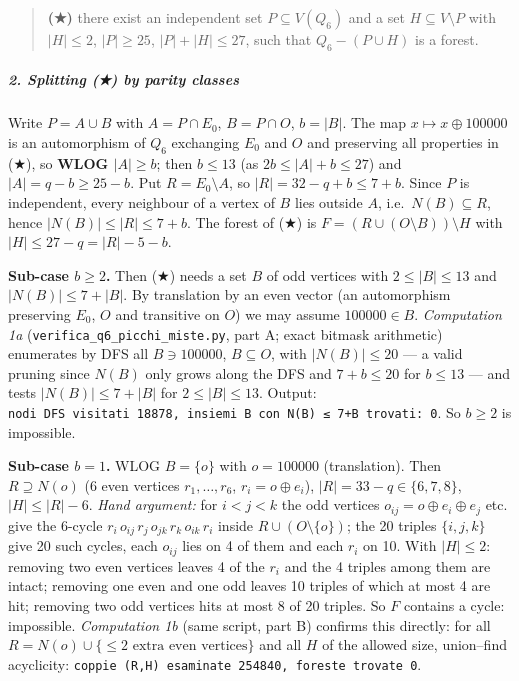 \documentclass[11pt,a4paper]{article}
\begin{document}
\begin{quote}
\textbf{(★)} there exist an independent set \(P\subseteq V(Q_6)\) and a
set \(H\subseteq V\setminus P\) with \(|H|\le2\), \(|P|\ge25\),
\(|P|+|H|\le27\), such that \(Q_6-(P\cup H)\) is a forest.
\end{quote}

\subparagraph{2. Splitting (★) by parity
classes}\label{splitting-by-parity-classes}

Write \(P=A\cup B\) with \(A=P\cap E_0\), \(B=P\cap O\), \(b=|B|\). The
map \(x\mapsto x\oplus 100000\) is an automorphism of \(Q_6\) exchanging
\(E_0\) and \(O\) and preserving all properties in (★), so \textbf{WLOG
\(|A|\ge b\)}; then \(b\le13\) (as \(2b\le|A|+b\le27\)) and
\(|A|=q-b\ge25-b\). Put \(R=E_0\setminus A\), so \(|R|=32-q+b\le7+b\).
Since \(P\) is independent, every neighbour of a vertex of \(B\) lies
outside \(A\), i.e.~\(N(B)\subseteq R\), hence \(|N(B)|\le|R|\le7+b\).
The forest of (★) is \(F=(R\cup(O\setminus B))\setminus H\) with
\(|H|\le27-q=|R|-5-b\).

\textbf{Sub-case \(b\ge2\).} Then (★) needs a set \(B\) of odd vertices
with \(2\le|B|\le13\) and \(|N(B)|\le7+|B|\). By translation by an even
vector (an automorphism preserving \(E_0\), \(O\) and transitive on
\(O\)) we may assume \(100000\in B\). \emph{Computation 1a}
(\texttt{verifica\_q6\_picchi\_miste.py}, part A; exact bitmask
arithmetic) enumerates by DFS all \(B\ni100000\), \(B\subseteq O\), with
\(|N(B)|\le20\) --- a valid pruning since \(N(B)\) only grows along the
DFS and \(7+b\le20\) for \(b\le13\) --- and tests \(|N(B)|\le7+|B|\) for
\(2\le|B|\le13\). Output:
\texttt{nodi\ DFS\ visitati\ 18878,\ insiemi\ B\ con\ \textbar{}N(B)\textbar{}\ ≤\ 7+\textbar{}B\textbar{}\ trovati:\ 0}.
So \(b\ge2\) is impossible.

\textbf{Sub-case \(b=1\).} WLOG \(B=\{o\}\) with \(o=100000\)
(translation). Then \(R\supseteq N(o)\) (6 even vertices
\(r_1,\dots,r_6\), \(r_i=o\oplus e_i\)), \(|R|=33-q\in\{6,7,8\}\),
\(|H|\le|R|-6\). \emph{Hand argument:} for \(i<j<k\) the odd vertices
\(o_{ij}=o\oplus e_i\oplus e_j\) etc. give the 6-cycle
\(r_i\,o_{ij}\,r_j\,o_{jk}\,r_k\,o_{ik}\,r_i\) inside
\(R\cup(O\setminus\{o\})\); the 20 triples \(\{i,j,k\}\) give 20 such
cycles, each \(o_{ij}\) lies on 4 of them and each \(r_i\) on 10. With
\(|H|\le2\): removing two even vertices leaves 4 of the \(r_i\) and the
4 triples among them are intact; removing one even and one odd leaves 10
triples of which at most 4 are hit; removing two odd vertices hits at
most 8 of 20 triples. So \(F\) contains a cycle: impossible.
\emph{Computation 1b} (same script, part B) confirms this directly: for
all \(R=N(o)\cup\{\le2\text{ extra even vertices}\}\) and all \(H\) of
the allowed size, union--find acyclicity:
\texttt{coppie\ (R,H)\ esaminate\ 254840,\ foreste\ trovate\ 0}.
\end{document}
